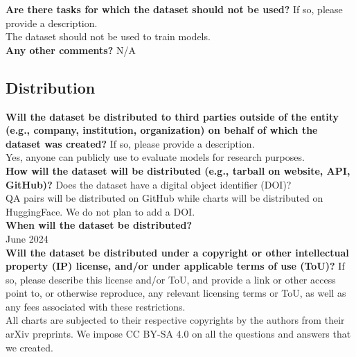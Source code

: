     \textcolor{\sectioncolor}{\textbf{Are there tasks for which the dataset should not be used?
    }
    If so, please provide a description.
    } \\
    The dataset should not be used to train models. \\

    \textcolor{\sectioncolor}{\textbf{Any other comments?
    }} N/A \\

\subsection{Distribution}

    \textcolor{\sectioncolor}{\textbf{Will the dataset be distributed to third parties outside of the entity
    (e.g., company, institution, organization) on behalf of which the dataset
    was created?
    }
    If so, please provide a description.
    } \\
    Yes, anyone can publicly use \ours{} to evaluate models for research purposes. \\

    \textcolor{\sectioncolor}{\textbf{How will the dataset will be distributed (e.g., tarball on website, API,
    GitHub)?
    }
    Does the dataset have a digital object identifier (DOI)?
    } \\
    QA pairs will be distributed on GitHub while charts will be distributed on HuggingFace. We do not plan to add a DOI. \\

    \textcolor{\sectioncolor}{\textbf{When will the dataset be distributed?
    }
    } \\
    June 2024 \\

    \textcolor{\sectioncolor}{\textbf{Will the dataset be distributed under a copyright or other intellectual
    property (IP) license, and/or under applicable terms of use (ToU)?
    }
    If so, please describe this license and/or ToU, and provide a link or other
    access point to, or otherwise reproduce, any relevant licensing terms or
    ToU, as well as any fees associated with these restrictions.
    } \\
    All charts are subjected to their respective copyrights by the authors from their arXiv preprints. We impose CC BY-SA 4.0 on all the questions and answers that we created. \\

